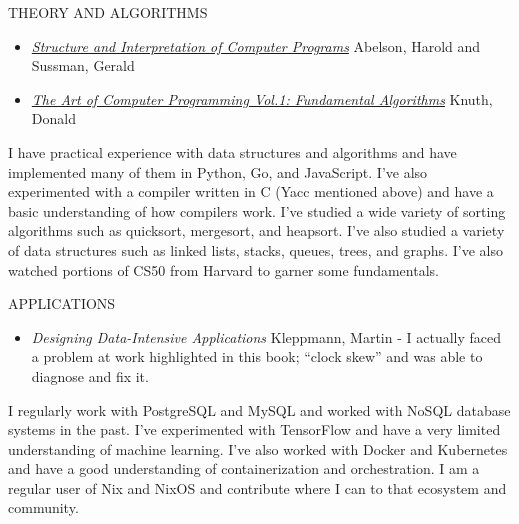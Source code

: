 \documentclass[12pt]{report}
\begin{document}
THEORY AND ALGORITHMS
\begin{itemize}
        \item \href{https://en.wikipedia.org/wiki/Structure_and_Interpretation_of_Computer_Programs}{\emph {Structure and Interpretation of Computer Programs}} Abelson, Harold and Sussman, Gerald
        \item \href{https://www-cs-faculty.stanford.edu/~knuth/taocp.html}{\emph {The Art of Computer Programming Vol.1: Fundamental Algorithms}} Knuth, Donald
\end{itemize}
I have practical experience with data structures and algorithms and have implemented many of them in Python, Go, and JavaScript. I've also experimented  with a compiler written in C (Yacc mentioned above) and have a basic understanding of how compilers work. I've studied a wide variety of sorting algorithms such as quicksort, mergesort, and heapsort. I've also studied a variety of data structures such as linked lists, stacks, queues, trees, and graphs. I've also watched portions of CS50 from Harvard to garner some fundamentals.\hfill \break

APPLICATIONS
\begin{itemize}
  \item \emph {Designing Data-Intensive Applications} Kleppmann, Martin - I actually faced a problem at work highlighted in this book; ``clock skew'' and was able to diagnose and fix it.
\end{itemize}
I regularly work with PostgreSQL and MySQL and worked with NoSQL database systems in the past. I've experimented with TensorFlow and have a very limited understanding of machine learning. I've also worked with Docker and Kubernetes and have a good understanding of containerization and orchestration. I am a regular user of Nix and NixOS and contribute where I can to that ecosystem and community.\hfill \break
\end{document}
